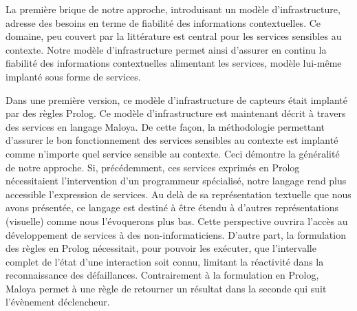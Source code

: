 La première brique de notre approche, introduisant un modèle d'infrastructure, adresse des besoins en terme de fiabilité des informations contextuelles. Ce domaine, peu couvert par la littérature est central pour les services sensibles au contexte.  Notre modèle d'infrastructure permet ainsi d'assurer en continu la fiabilité des informations contextuelles alimentant les services, modèle lui-même implanté sous forme de services.  \newline

Dans une première version, ce modèle d'infrastructure de capteurs était implanté par des règles Prolog. Ce modèle d'infrastructure est maintenant décrit à travers des services en langage Maloya.  De cette façon, la méthodologie permettant d'assurer le bon fonctionnement des services sensibles au contexte est implanté comme n'importe quel service sensible au contexte. Ceci démontre la généralité de notre approche.  Si, précédemment, ces services exprimés en Prolog nécessitaient l'intervention d'un programmeur spécialisé, notre langage rend plus accessible l'expression de services.  Au delà de sa représentation textuelle que nous avons présentée, ce langage est destiné à être étendu à d'autres représentations (\eg visuelle) comme nous l'évoquerons plus bas. Cette perspective ouvrira l'acc\`{e}s au développement de services à des non-informaticiens.  D'autre part, la formulation des règles en Prolog nécessitait, pour pouvoir les exécuter, que l'intervalle complet de l'état d'une interaction soit connu, limitant la réactivité dans la reconnaissance des défaillances. Contrairement \`a la formulation en Prolog, Maloya permet à une règle de retourner un résultat dans la seconde qui suit l'évènement déclencheur.

% 


